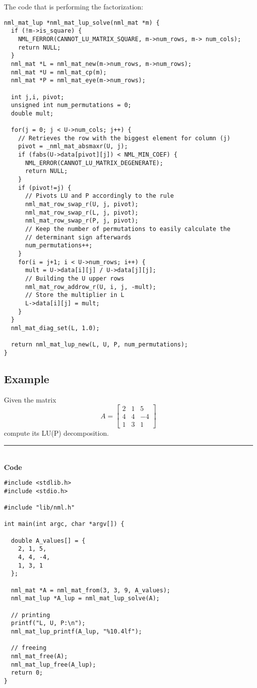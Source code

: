 The code that is performing the factorization:

\begin{verbatim}
nml_mat_lup *nml_mat_lup_solve(nml_mat *m) {
  if (!m->is_square) {
    NML_FERROR(CANNOT_LU_MATRIX_SQUARE, m->num_rows, m-> num_cols);
    return NULL;
  }
  nml_mat *L = nml_mat_new(m->num_rows, m->num_rows);
  nml_mat *U = nml_mat_cp(m);
  nml_mat *P = nml_mat_eye(m->num_rows);

  int j,i, pivot;
  unsigned int num_permutations = 0;
  double mult;

  for(j = 0; j < U->num_cols; j++) {
    // Retrieves the row with the biggest element for column (j)
    pivot = _nml_mat_absmaxr(U, j);
    if (fabs(U->data[pivot][j]) < NML_MIN_COEF) {
      NML_ERROR(CANNOT_LU_MATRIX_DEGENERATE);
      return NULL;
    }
    if (pivot!=j) {
      // Pivots LU and P accordingly to the rule
      nml_mat_row_swap_r(U, j, pivot);
      nml_mat_row_swap_r(L, j, pivot);
      nml_mat_row_swap_r(P, j, pivot);
      // Keep the number of permutations to easily calculate the
      // determinant sign afterwards
      num_permutations++;
    }
    for(i = j+1; i < U->num_rows; i++) {
      mult = U->data[i][j] / U->data[j][j];
      // Building the U upper rows
      nml_mat_row_addrow_r(U, i, j, -mult);
      // Store the multiplier in L
      L->data[i][j] = mult;
    }
  }
  nml_mat_diag_set(L, 1.0);

  return nml_mat_lup_new(L, U, P, num_permutations);
} 
\end{verbatim}

\subsection{Example}

\textsf{
\example Given the matrix
$$
A = \left[
\begin{array}{rrr}
2 & 1 & 5 \\
4 & 4 & -4 \\
1 & 3 & 1
\end{array}
\right]
$$
compute its LU(P) decomposition.
}

\rule{80mm}{0.5pt}\\
{\bf Code}
\begin{verbatim}
#include <stdlib.h>
#include <stdio.h>

#include "lib/nml.h"

int main(int argc, char *argv[]) {

  double A_values[] = {
    2, 1, 5,
    4, 4, -4,
    1, 3, 1
  };

  nml_mat *A = nml_mat_from(3, 3, 9, A_values);
  nml_mat_lup *A_lup = nml_mat_lup_solve(A);

  // printing
  printf("L, U, P:\n");
  nml_mat_lup_printf(A_lup, "%10.4lf");

  // freeing
  nml_mat_free(A); 
  nml_mat_lup_free(A_lup);
  return 0;
}
\end{verbatim}

